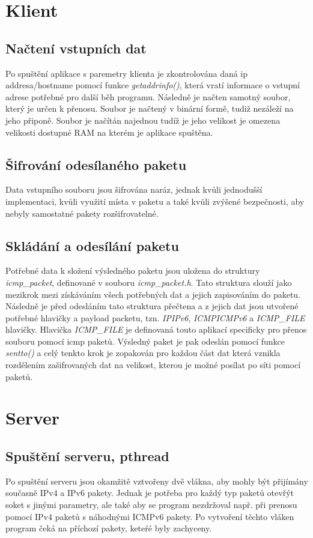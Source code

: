 \documentclass[a4paper, 11pt]{article}
\begin{document}
\newpage
\section{Klient}

\subsection{Načtení vstupních dat}
Po spuštění aplikace s paremetry klienta je zkontrolována daná ip addresa/hostname pomocí funkce \textit{getaddrinfo()}, která vratí informace o vstupní adrese potřebné pro další běh programu. Následně je načten samotný soubor, který je určen k přenosu. Soubor je načtený v binární formě, tudiž nezáleží na jeho připoně. Soubor je načítán najednou tudíž je jeho velikost je omezena velikosti dostupné RAM na kterém je aplikace spuštěna.

\subsection{Šifrování odesílaného paketu}
Data vstupního souboru jsou šifrována naráz, jednak kvůli jednodušší implementaci, kvůli využití místa v paketu a také kvůli zvýšené bezpečnosti, aby nebyly samostatné pakety rozšifrovatelné.

\subsection{Skládání a odesílání paketu}
Potřebné data k složení výsledného paketu jsou uložena do struktury \textit{icmp\_packet}, definované v souboru \textit{icmp\_packet.h}. Tato struktura slouží jako mezikrok mezi získáváním všech potřebných dat a jejich zapisováním do paketu. Následně je před odesláním tato struktura přečtena a z jejich dat jsou utvořené potřebné hlavičky a payload packetu, tzn. \textit{IP\/IPv6}, \textit{ICMP\/ICMPv6} a \textit{ICMP\_FILE} hlavičky. Hlavička \textit{ICMP\_FILE} je definovaná touto aplikací specificky pro přenos souboru pomocí icmp paketů. Výsledný paket je pak odeslán pomocí funkce \textit{sentto()} a celý tenkto krok je zopakován pro každou část dat  která vznikla rozdělením zašifrovaných dat na velikost, kterou je možné posílat po síti pomocí paketů.

\newpage
\section{Server}

\subsection{Spuštění serveru, pthread}
Po spuštění serveru jsou okamžitě vztvořeny dvě vlákna, aby mohly být přijímány současně IPv4 a IPv6 pakety. Jednak je potřeba pro každý typ paketů otevřýt soket s jinými parametry, ale také aby se program nezdržoval např. při prenosu pomocí IPv4 paketů s náhodnými ICMPv6 pakety. Po vytvoření těchto vláken program čeká na příchozí pakety, keteŕé byly zachyceny.
\end{document}
